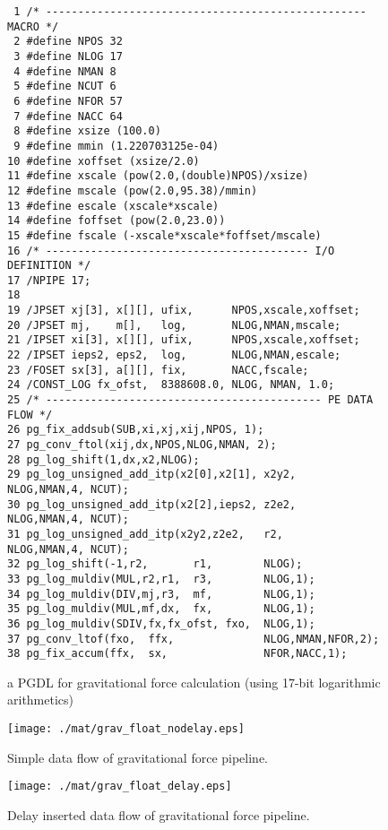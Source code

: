 \documentclass{llncs}
\begin{document}
\begin{figure}
\scriptsize
{\tiny
\begin{verbatim}
 1 /* -------------------------------------------------- MACRO */
 2 #define NPOS 32
 3 #define NLOG 17
 4 #define NMAN 8
 5 #define NCUT 6
 6 #define NFOR 57
 7 #define NACC 64
 8 #define xsize (100.0)
 9 #define mmin (1.220703125e-04)
10 #define xoffset (xsize/2.0)
11 #define xscale (pow(2.0,(double)NPOS)/xsize)
12 #define mscale (pow(2.0,95.38)/mmin)
13 #define escale (xscale*xscale)
14 #define foffset (pow(2.0,23.0))
15 #define fscale (-xscale*xscale*foffset/mscale)
16 /* ----------------------------------------- I/O DEFINITION */
17 /NPIPE 17;
18
19 /JPSET xj[3], x[][], ufix,      NPOS,xscale,xoffset;
20 /JPSET mj,    m[],   log,       NLOG,NMAN,mscale;
21 /IPSET xi[3], x[][], ufix,      NPOS,xscale,xoffset;
22 /IPSET ieps2, eps2,  log,       NLOG,NMAN,escale;
23 /FOSET sx[3], a[][], fix,       NACC,fscale;
24 /CONST_LOG fx_ofst,  8388608.0, NLOG, NMAN, 1.0;
25 /* ------------------------------------------- PE DATA FLOW */
26 pg_fix_addsub(SUB,xi,xj,xij,NPOS, 1);
27 pg_conv_ftol(xij,dx,NPOS,NLOG,NMAN, 2);
28 pg_log_shift(1,dx,x2,NLOG);
29 pg_log_unsigned_add_itp(x2[0],x2[1], x2y2,   NLOG,NMAN,4, NCUT);
30 pg_log_unsigned_add_itp(x2[2],ieps2, z2e2,   NLOG,NMAN,4, NCUT);
31 pg_log_unsigned_add_itp(x2y2,z2e2,   r2,     NLOG,NMAN,4, NCUT);
32 pg_log_shift(-1,r2,       r1,        NLOG);
33 pg_log_muldiv(MUL,r2,r1,  r3,        NLOG,1);
34 pg_log_muldiv(DIV,mj,r3,  mf,        NLOG,1);
35 pg_log_muldiv(MUL,mf,dx,  fx,        NLOG,1);
36 pg_log_muldiv(SDIV,fx,fx_ofst, fxo,  NLOG,1);
37 pg_conv_ltof(fxo,  ffx,              NLOG,NMAN,NFOR,2);
38 pg_fix_accum(ffx,  sx,               NFOR,NACC,1);
\end{verbatim}
}
\caption{a PGDL for gravitational force calculation (using 17-bit logarithmic arithmetics)}
\label{figgrav5_pgdl}
\end{figure}

\begin{figure}[htb]
\begin{center}
\texttt{[image: ./mat/grav\_float\_nodelay.eps]}
\caption{Simple data flow of gravitational force pipeline.}
\label{fig_grav_float_nodelay}
\end{center}
\end{figure}

\begin{figure}[htb]
\begin{center}
\texttt{[image: ./mat/grav\_float\_delay.eps]}
\caption{Delay inserted data flow of gravitational force pipeline.}
\label{fig_grav_float_delay}
\end{center}
\end{figure}
\end{document}
